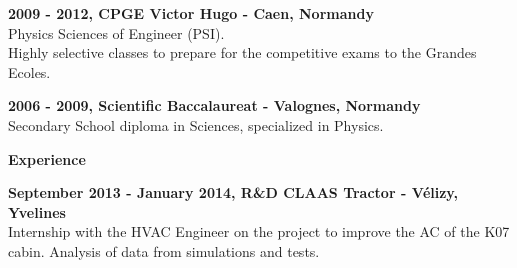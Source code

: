 \documentclass[a4paper,12pt,final]{memoir}
\newcommand{\Sep}{\vspace{1.5em}}
\newcommand{\SmallSep}{\vspace{0.5em}}
\newcommand{\CVSection}[1]
	{\Large\textbf{#1}\par
	\SmallSep\normalsize\normalfont}
\newcommand{\CVItem}[2]
	{\textbf{\color{RoyalBlue} #1 - {\small\color{black}#2}}\normalsize\normalfont}
\begin{document}
\CVItem{2009 - 2012, CPGE Victor Hugo}{Caen, Normandy}\\
Physics Sciences of Engineer (PSI).\\
Highly selective classes to prepare for the competitive exams to the Grandes Ecoles.
\SmallSep

\CVItem{2006 - 2009, Scientific Baccalaureat}{Valognes, Normandy}\\
Secondary School diploma in Sciences, specialized in Physics.
\Sep

\CVSection{Experience}
\CVItem{September 2013 - January 2014, R\&D CLAAS Tractor}{Vélizy, Yvelines}\\
Internship with the HVAC Engineer on the project to improve the AC of the K07 cabin.
Analysis of data from simulations and tests.
\SmallSep

% 
% 
% 
% 
% 
% 

\end{document}
